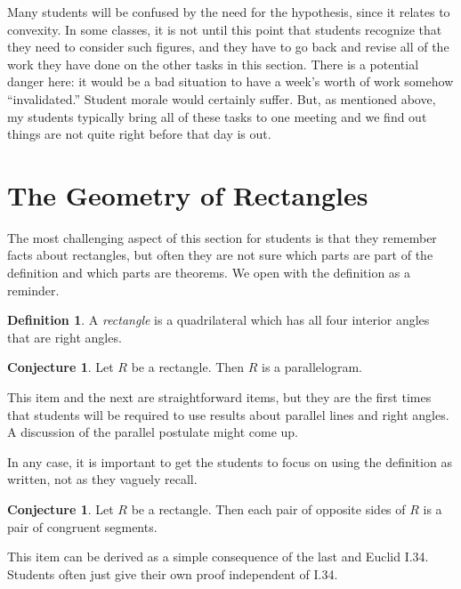 \documentclass{tufte-handout}
\theoremstyle{definition}
\newtheorem{conjecture}[problem]{Conjecture}
\newtheorem*{definition}{Definition}
\begin{document}
Many students will be confused by the need for the hypothesis, since it relates to convexity. In some classes, it is not until this point that students recognize that they need to consider such figures, and they have to go back and revise all of the work they have done on the other tasks in this section. 
There is a potential danger here: it would be a bad situation to have a week's worth of work somehow ``invalidated.'' Student morale would certainly suffer. But, as mentioned above, my students typically bring all of these tasks to one meeting and we find out things are not quite right before that day is out. 


\clearpage
\setcounter{section}{3}
\setcounter{problem}{0}
\section{The Geometry of Rectangles}

The most challenging aspect of this section for students is that they remember facts about rectangles, but often they are not sure which parts are part of the definition and which parts are theorems. We open with the definition as a reminder.

\begin{definition}\label{defn:rectangle}
A \emph{rectangle} is a quadrilateral which has all four interior angles that are right angles.
\end{definition}

\begin{conjecture}
\label{conj:rectangle-parallelogram}
Let $R$ be a rectangle. Then $R$ is a parallelogram.
\end{conjecture}

This item and the next are straightforward items, but they are the first times that students will be required to use results about parallel lines and right angles. A discussion of the parallel postulate might come up.

In any case, it is important to get the students to focus on using the definition as written, not as they vaguely recall.

\begin{conjecture}
\label{conj:rectangle-opp-sides}
Let $R$ be a rectangle. Then each pair of opposite sides of $R$ is a pair of congruent segments.
\end{conjecture}

This item can be derived as a simple consequence of the last and Euclid I.34. Students often just give their own proof independent of I.34.
\end{document}
